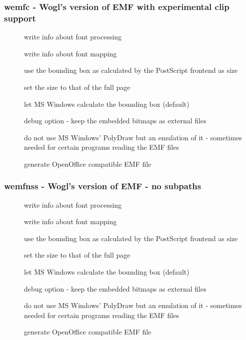 \documentclass[english,a4paper]{article}
\begin{document}
\subsubsection{wemfc - Wogl's version of EMF with experimental clip support}
\begin{description}
\item[]
write info about font processing


\item[]
write info about font mapping


\item[]
use the bounding box as calculated by the PostScript frontend as size


\item[]
set the size to that of the full page


\item[]
let MS Windows calculate the bounding box (default)


\item[]
debug option - keep the embedded bitmaps as external files


\item[]
do not use MS Windows' PolyDraw but an emulation of it - sometimes needed for certain programs reading the EMF files


\item[]
generate OpenOffice compatible EMF file


\end{description}
\subsubsection{wemfnss - Wogl's version of EMF - no subpaths}
\begin{description}
\item[]
write info about font processing


\item[]
write info about font mapping


\item[]
use the bounding box as calculated by the PostScript frontend as size


\item[]
set the size to that of the full page


\item[]
let MS Windows calculate the bounding box (default)


\item[]
debug option - keep the embedded bitmaps as external files


\item[]
do not use MS Windows' PolyDraw but an emulation of it - sometimes needed for certain programs reading the EMF files


\item[]
generate OpenOffice compatible EMF file


\end{description}
\end{document}
